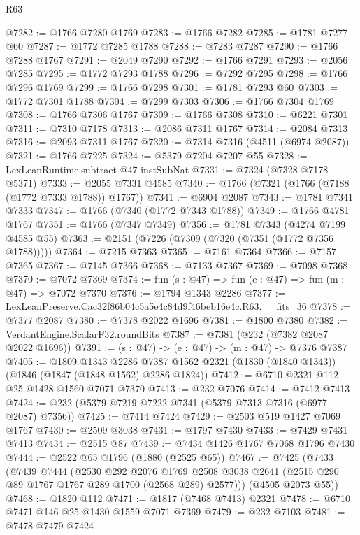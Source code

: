 \begin{lexlean}{R63}
\begin{coremodule}
@7282 := @1766 @7280 @1769
@7283 := @1766 @7282
@7285 := @1781 @7277 @60
@7287 := @1772 @7285 @1788
@7288 := @7283 @7287
@7290 := @1766 @7288 @1767
@7291 := @2049 @7290
@7292 := @1766 @7291
@7293 := @2056 @7285
@7295 := @1772 @7293 @1788
@7296 := @7292 @7295
@7298 := @1766 @7296 @1769
@7299 := @1766 @7298
@7301 := @1781 @7293 @60
@7303 := @1772 @7301 @1788
@7304 := @7299 @7303
@7306 := @1766 @7304 @1769
@7308 := @1766 @7306 @1767
@7309 := @1766 @7308
@7310 := @6221 @7301
@7311 := @7310 @7178
@7313 := @2086 @7311 @1767
@7314 := @2084 @7313
@7316 := @2093 @7311 @1767
@7320 := @7314 @7316 (@4511 (@6974 @2087))
@7321 := @1766 @7225
@7324 := @5379 @7204 @7207 @55
@7328 := LexLeanRuntime.subtract @47 instSubNat
@7331 := @7324 (@7328 @7178 @5371)
@7333 := @2055 @7331 @4585
@7340 := @1766 (@7321 (@1766 (@7188 (@1772 @7333 @1788)) @1767))
@7341 := @6904 @2087
@7343 := @1781 @7341 @7333
@7347 := @1766 (@7340 (@1772 @7343 @1788))
@7349 := @1766 @4781 @1767
@7351 := @1766 (@7347 @7349)
@7356 := @1781 @7343 (@4274 @7199 @4585 @55)
@7363 := @2151 (@7226 (@7309 (@7320 (@7351 (@1772 @7356 @1788)))))
@7364 := @7215 @7363
@7365 := @7161 @7364
@7366 := @7157 @7365
@7367 := @7145 @7366
@7368 := @7133 @7367
@7369 := @7098 @7368
@7370 := @7072 @7369
@7374 := fun (s : @47) => fun (e : @47) => fun (m : @47) => @7072 @7370
@7376 := @1794 @1343 @2286
@7377 := LexLeanPreserve.Cac32f86b04c5a5e4c84d9f46beb16e4c.R63.__fits_36
@7378 := @7377 @2087
@7380 := @7378 @2022 @1696
@7381 := @1800 @7380
@7382 := VerdantEngine.ScalarF32.roundBits
@7387 := @7381 (@232 (@7382 @2087 @2022 @1696))
@7391 := (s : @47) -> (e : @47) -> (m : @47) -> @7376 @7387
@7405 := @1809
    @1343
    @2286
    @7387
    @1562
    @2321
    (@1830 (@1840 @1343))
    (@1846 (@1847 (@1848 @1562) @2286 @1824))
@7412 := @6710 @2321 @112 @25 @1428 @1560 @7071 @7370
@7413 := @232 @7076
@7414 := @7412 @7413
@7424 := @232 (@5379 @7219 @7222 @7341 (@5379 @7313 @7316 (@6977 @2087) @7356))
@7425 := @7414 @7424
@7429 := @2503 @519 @1427 @7069 @1767
@7430 := @2509 @3038
@7431 := @1797 @7430
@7433 := @7429 @7431 @7413
@7434 := @2515 @87
@7439 := @7434 @1426 @1767 @7068 @1796 @7430
@7444 := @2522 @65 @1796 (@1880 (@2525 @65))
@7467 := @7425
    (@7433
      (@7439
        @7444
        (@2530
          @292
          @2076
          @1769
          @2508
          @3038
          @2641
          (@2515 @290 @89 @1767 @1767 @289 @1700 (@2568 @289) @2577)))
      (@4505 @2073 @55))
@7468 := @1820 @112
@7471 := @1817 (@7468 @7413) @2321
@7478 := @6710 @7471 @146 @25 @1430 @1559 @7071 @7369
@7479 := @232 @7103
@7481 := @7478 @7479 @7424

\end{coremodule}
\end{lexlean}
